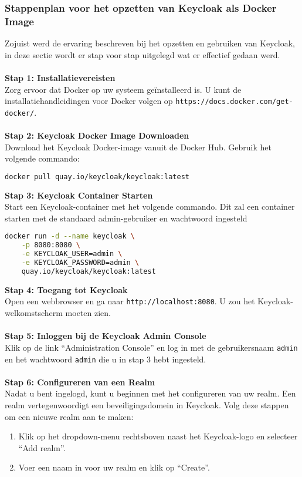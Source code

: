\subsubsection{Stappenplan voor het opzetten van Keycloak als Docker Image}%
\label{subsubsec:keycloak-setup}
Zojuist werd de ervaring beschreven bij het opzetten en gebruiken van Keycloak, in deze sectie wordt er stap voor stap uitgelegd wat er effectief gedaan werd.\\\\
\textbf{Stap 1: Installatievereisten}\\
Zorg ervoor dat Docker op uw systeem geïnstalleerd is. U kunt de installatiehandleidingen voor Docker volgen op \texttt{https://docs.docker.com/get-docker/}.\\\\
\textbf{Stap 2: Keycloak Docker Image Downloaden}\\
Download het Keycloak Docker-image vanuit de Docker Hub. Gebruik het volgende commando:
\begin{lstlisting}[language=bash]
docker pull quay.io/keycloak/keycloak:latest
\end{lstlisting}
\textbf{Stap 3: Keycloak Container Starten}\\
Start een Keycloak-container met het volgende commando. Dit zal een container starten met de standaard admin-gebruiker en wachtwoord ingesteld
\begin{lstlisting}[language=bash]
docker run -d --name keycloak \
    -p 8080:8080 \
    -e KEYCLOAK_USER=admin \
    -e KEYCLOAK_PASSWORD=admin \
    quay.io/keycloak/keycloak:latest
\end{lstlisting}
\textbf{Stap 4: Toegang tot Keycloak}\\
Open een webbrowser en ga naar \texttt{http://localhost:8080}. U zou het Keycloak-welkomstscherm moeten zien.\\\\
\textbf{Stap 5: Inloggen bij de Keycloak Admin Console}\\
Klik op de link ``Administration Console'' en log in met de gebruikersnaam \texttt{admin} en het wachtwoord \texttt{admin} die u in stap 3 hebt ingesteld.\\\\
\textbf{Stap 6: Configureren van een Realm}\\
Nadat u bent ingelogd, kunt u beginnen met het configureren van uw realm. Een realm vertegenwoordigt een beveiligingsdomein in Keycloak. Volg deze stappen om een nieuwe realm aan te maken:
\begin{enumerate}
    \item Klik op het dropdown-menu rechtsboven naast het Keycloak-logo en selecteer ``Add realm''.
    \item Voer een naam in voor uw realm en klik op ``Create''.
\end{enumerate}
